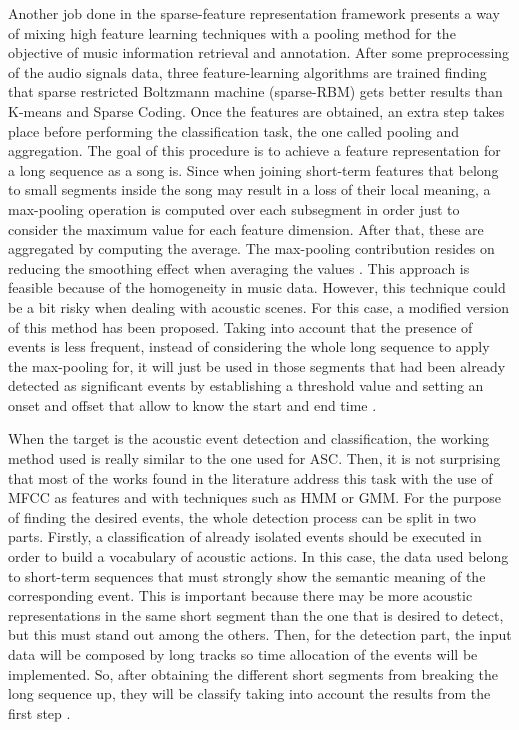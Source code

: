 	Another job done in the sparse-feature representation framework presents a way of mixing high feature learning techniques with a pooling method for the objective of music information retrieval and annotation. After some preprocessing of the audio signals data, three feature-learning algorithms are trained finding that sparse restricted Boltzmann machine (sparse-RBM) gets better results than K-means and Sparse Coding. Once the features are obtained, an extra step takes place before performing the classification task, the one called pooling and aggregation. The goal of this procedure is to achieve a feature representation for a long sequence as a song is. Since when joining short-term features that belong to small segments inside the song may result in a loss of their local meaning, a max-pooling operation is computed over each subsegment in order just to consider the maximum value for each feature dimension. After that, these are aggregated by computing the average. The max-pooling contribution resides on reducing the smoothing effect when averaging the values \cite{Nam2012}. This approach is feasible because of the homogeneity in music data. However, this technique could be a bit risky when dealing with acoustic scenes. For this case, a modified version of this method has been proposed. Taking into account that the presence of events is less frequent, instead of considering the whole long sequence to apply the max-pooling for, it will just be used in those segments that had been already detected as significant events by establishing a threshold value and setting an onset and offset that allow to know the start and end time \cite{Lee2013}.
	
	When the target is the acoustic event detection and classification, the working method used is really similar to the one used for ASC. Then, it is not surprising that most of the works found in the literature address this task with the use of MFCC as features and with techniques such as HMM or GMM. For the purpose of finding the desired events, the whole detection process can be split in two parts. Firstly, a classification of already isolated events should be executed in order to build a vocabulary of acoustic actions. In this case, the data used belong to short-term sequences that must strongly show the semantic meaning of the corresponding event. This is important because there may be more acoustic representations in the same short segment than the one that is desired to detect, but this must stand out among the others.  Then, for the detection part, the input data will be composed by long tracks so time allocation of the events will be implemented. So, after obtaining the different short segments from breaking the long sequence up, they will be classify taking into account the results from the first step \cite{Mesaros2010}. 


